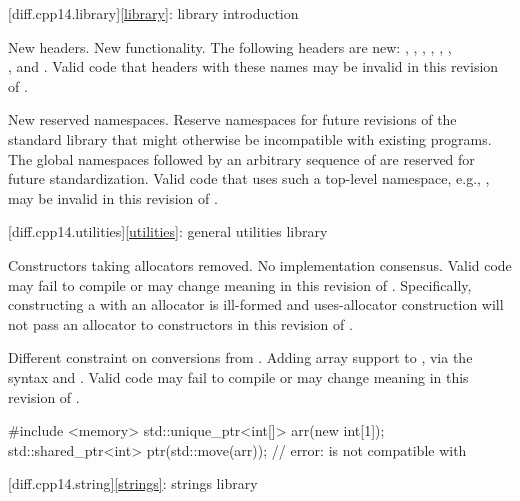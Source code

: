 [diff.cpp14.library]{\ref{library}: library introduction}

\change
New headers.
\rationale
New functionality.
\effect
The following \Cpp{} headers are new:
,
,
,
,
,
,\\
,
and
.
Valid \CppXIV{} code that  headers with these names may be
invalid in this revision of \Cpp{}.

\change
New reserved namespaces.
\rationale
Reserve namespaces for future revisions of the standard library
that might otherwise be incompatible with existing programs.
\effect
The global namespaces 
followed by an arbitrary sequence of 
are reserved for future standardization.
Valid \CppXIV{} code that uses such a top-level namespace,
e.g., , may be invalid in this revision of \Cpp{}.

[diff.cpp14.utilities]{\ref{utilities}: general utilities library}

\change
Constructors taking allocators removed.
\rationale
No implementation consensus.
\effect
Valid \CppXIV{} code may fail to compile or may change meaning in this
revision of \Cpp{}. Specifically, constructing a  with
an allocator is ill-formed and uses-allocator construction will not pass an
allocator to  constructors in this revision of \Cpp{}.

\change
Different constraint on conversions from .
\rationale
Adding array support to ,
via the syntax  and .
\effect
Valid \CppXIV{} code may fail to compile or may change meaning in this
revision of \Cpp{}.
\begin{example}
\begin{codeblock}
#include <memory>
std::unique_ptr<int[]> arr(new int[1]);
std::shared_ptr<int> ptr(std::move(arr));   // error:  is not compatible with 
\end{codeblock}
\end{example}

[diff.cpp14.string]{\ref{strings}: strings library}

